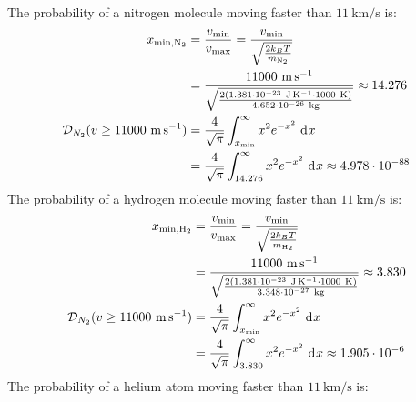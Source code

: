 \documentclass{article}
\begin{document}
\clearpage

The probability of a nitrogen molecule moving faster than $11~\unit{\kilo\meter\per\second}$ is:
\begin{equation}
    \begin{split}
        x_{\text{min},\ce{N2}} & = \frac{v_{\text{min}}}{v_{\text{max}}} = \frac{v_{\text{min}}}{\sqrt{\frac{2k_BT}{m_{\ce{N2}}}}} \\
        & = \frac{11000~\unit{\meter\per\second}}{\sqrt{\frac{2\left(1.381 \cdot 10^{-23}~\unit{\joule\per\kelvin} \cdot 1000~\unit{\kelvin}\right)}{4.652 \cdot 10^{-26}~\unit{\kilo\gram}}}} \approx 14.276 \\
        \mathcal{D}_{N_2}(v \geq 11000~\unit{\meter\per\second}) & = \frac{4}{\sqrt{\pi}}\int_{x_{\text{min}}}^{\infty} x^2 e^{-x^2} \, \diff{x} \\
        & = \frac{4}{\sqrt{\pi}}\int_{14.276}^{\infty} x^2 e^{-x^2} \, \diff{x} \approx 4.978 \cdot 10^{-88} \\
    \end{split}
\end{equation}
The probability of a hydrogen molecule moving faster than $11~\unit{\kilo\meter\per\second}$ is:
\begin{equation}
    \begin{split}
        x_{\text{min},\ce{H2}} & = \frac{v_{\text{min}}}{v_{\text{max}}} = \frac{v_{\text{min}}}{\sqrt{\frac{2k_BT}{m_{\ce{H2}}}}} \\
        & = \frac{11000~\unit{\meter\per\second}}{\sqrt{\frac{2\left(1.381 \cdot 10^{-23}~\unit{\joule\per\kelvin} \cdot 1000~\unit{\kelvin}\right)}{3.348 \cdot 10^{-27}~\unit{\kilo\gram}}}} \approx 3.830 \\
        \mathcal{D}_{N_2}(v \geq 11000~\unit{\meter\per\second}) & = \frac{4}{\sqrt{\pi}}\int_{x_{\text{min}}}^{\infty} x^2 e^{-x^2} \, \diff{x} \\
        & = \frac{4}{\sqrt{\pi}}\int_{3.830}^{\infty} x^2 e^{-x^2} \, \diff{x} \approx 1.905 \cdot 10^{-6} \\
    \end{split}
\end{equation}
The probability of a helium atom moving faster than $11~\unit{\kilo\meter\per\second}$ is:
\end{document}
